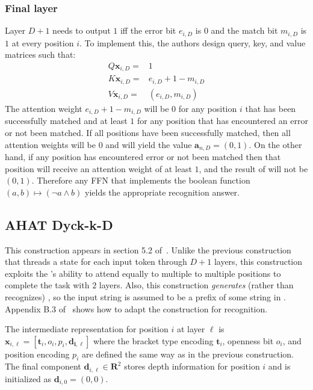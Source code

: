 \subsubsection{Final layer}
Layer $D + 1$ needs to output $1$ iff the error bit $e_{i,D}$ is $0$ and the match bit $m_{i,D}$ is $1$ at every position $i$. To implement this, the authors design query, key, and value matrices such that:\begin{align*}
    Q\mathbf{x}_{i,D} = & 1 \\
    K\mathbf{x}_{i,D} = & e_{i,D}+1-m_{i,D}\\
    V\mathbf{x}_{i,D} = & (e_{i,D},m_{i,D})
\end{align*}
The attention weight $e_{i,D}+1-m_{i,D}$ will be $0$ for any position $i$ that has been successfully matched and at least $1$ for any position that has encountered an error or not been matched. If all positions have been successfully matched, then all attention weights will be $0$ and \UHAT{} will yield the value $\mathbf{a}_{n,D}=(0,1)$. On the other hand, if any position has encountered error or not been matched then that position will receive an attention weight of at least $1$, and the result of \UHAT{} will not be $(0,1)$. Therefore any FFN that implements the boolean function $(a,b) \mapsto (\neg a \land b)$ yields the appropriate recognition answer.

\subsection{AHAT Dyck-k-D}
This construction appears in section 5.2 of~\citet{yao-2021-self-attention}. Unlike the previous construction that threads a state for each input token through $D+1$ layers, this construction exploits the \AHAT{}'s ability to attend equally to multiple to multiple positions to complete the task with $2$ layers. Also, this construction \textit{generates} (rather than recognizes) , so the input string is assumed to be a prefix of some string in . Appendix B.3 of~\citet{yao-2021-self-attention} shows how to adapt the construction for recognition.

The intermediate representation for position $i$ at layer $\ell$ is $\mathbf{x}_{i,\ell} = [\mathbf{t}_i,o_i,p_i,\mathbf{d_{i,\ell}}]$ where the bracket type encoding $\mathbf{t}_i$, openness bit $o_i$, and position encoding $p_i$ are defined the same way as in the previous construction. The final component $\mathbf{d}_{i,\ell} \in \mathbf{R}^2$ stores depth information for position $i$ and is initialized as $\mathbf{d}_{i,0}=(0,0)$.

